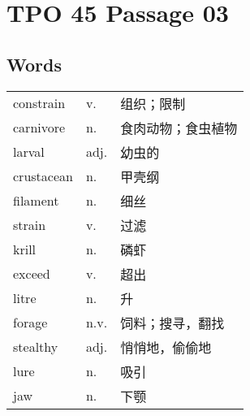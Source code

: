 \section{TPO 45 Passage 03}

\subsection{Words}

\begin{tabular}{lll}
    constrain  & v.   & 组织；限制     \\
    carnivore  & n.   & 食肉动物；食虫植物 \\
    larval     & adj. & 幼虫的       \\
    crustacean & n.   & 甲壳纲       \\
    filament   & n.   & 细丝        \\
    strain     & v.   & 过滤        \\
    krill      & n.   & 磷虾        \\
    exceed     & v.   & 超出        \\
    litre      & n.   & 升         \\
    forage     & n.v. & 饲料；搜寻，翻找  \\
    stealthy   & adj. & 悄悄地，偷偷地   \\
    lure       & n.   & 吸引        \\
    jaw        & n.   & 下颚        \\
\end{tabular}


